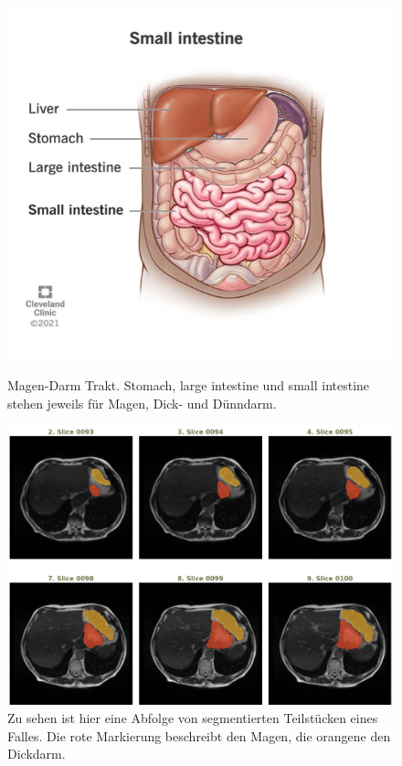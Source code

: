 \begin{figure}[H]
   \begin{minipage}{0.49\textwidth}
     \centering
     \includegraphics[width=1\linewidth]{bilder/intestines}
     \caption{Magen-Darm Trakt. Stomach, large intestine und small intestine stehen jeweils für Magen, Dick- und Dünndarm.}\label{Fig:magen-darm-trakt}
   \end{minipage}
   \hfill\hfill
   \begin{minipage}{0.49\textwidth}
     \centering
     \includegraphics[width=1\linewidth]{LaTex/bilder/beispieldaten.png}
     \caption{ Zu sehen ist hier eine Abfolge von segmentierten Teilstücken eines Falles. Die rote Markierung beschreibt den Magen, die orangene den Dickdarm.}\label{Fig:magen-mrt}
   \end{minipage}
\end{figure}

